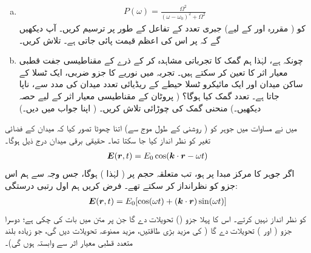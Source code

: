 \begin{enumerate}[a.]
 
\item
{}
\begin{align}
	P(\omega) = \frac{\Omega^2}{(\omega-\omega_0)^2+\Omega^2}
\end{align}
کو ( مقررہ  اور  کے لیے) جبری تعدد  کے تفاعل کے طور پر ترسیم کریں۔ آپ دیکھیں گے کہ  پر اس کی اعظم قیمت پائی جاتی ہے۔  تلاش کریں۔
\item
 چونکہ  ہے، لہٰذا ہم گمک کا تجرباتی مشاہدہ کر کے ذرے کے مقناطیسی جفت قطبی معیار اثر کا تعین کر سکتے ہیں۔  تجربہ میں نوریے کا  جزو ضربی، ایک ٹسلا کے ساکن میدان اور ایک مائیکرو ٹسلا  حیطے کے ریڈیائی تعدد میدان کی مدد سے، ناپا جاتا ہے۔ تعدد گمک کیا ہوگا؟ ( پروٹان کے مقناطیسی معیار اثر کے لیے حصہ  دیکھیں۔) منحنی گمک کی چوڑائی تلاش کریں۔ ( اپنا جواب  میں دیں۔)
 \end{enumerate}
میں نے مساوات  میں جوہر کو ( روشنی کے طول موج سے) اتنا چھوٹا تصور کیا کہ میدان کے فضائی تغیر کو نظر انداز کیا جا سکتا تھا۔ حقیقی برقی میدان درج ذیل ہوگا۔
\begin{align}
{\ensuremath{{\boldsymbol{E}}}}({{\boldsymbol{r}}},t) = E_0\cos({{\boldsymbol{k}}}\cdot {\ensuremath{{\boldsymbol{r}}}}-\omega t)
\end{align}
اگر جوہر کا مرکز مبدا پر ہو، تب متعلقہ حجم پر  
( لہٰذا  ) ہوگا، جس وجہ سے ہم اس جزو کو نظرانداز کر سکتے تھے۔ فرض کریں ہم اول رتبی درستگی:
\begin{align}
{\ensuremath{{\boldsymbol{E}}}}({{\boldsymbol{r}}},t) = E_0[\cos(\omega t)+({{\boldsymbol{k}}}\cdot{\ensuremath{{\boldsymbol{r}}}})\sin(\omega t)]
\end{align}
کو نظر انداز نہیں کرتے۔ اس کا پہلا جزو  ()  تحویلات دے گا جن پر متن میں بات کی چکی ہے؛ دوسرا جزو  (  اور ) تحویلات دے گا (  کی مزید بڑی طاقتیں، مزید ممنوعہ تحویلات دیں گی، جو زیادہ بلند متعدد قطبی معیار اثر سے وابستہ ہوں گی)۔

